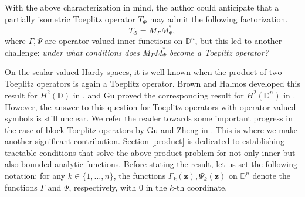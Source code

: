 \documentclass[12pt]{amsart}
\theoremstyle{definition}
\newcommand{\D}{\mathbb{D}}
\newcommand{\1}{{\mbox{\bf 1}}}
\begin{document}
With the above characterization in mind, the author could anticipate that a partially isometric Toeplitz operator $T_{\Phi}$ may admit the following factorization.
\[
T_{\Phi} = M_{\Gamma} M_{\Psi}^*,
\]
where $\Gamma, \Psi$ are operator-valued inner functions on $\D^n$, but this led to another challenge: \textit{under what conditions does $M_{\Gamma} M_{\Psi}^*$ become a Toeplitz operator?}

On the scalar-valued Hardy spaces, it is well-known when the product of two Toeplitz operators is again a Toeplitz operator. Brown and Halmos developed this result for $H^2(\D)$ in  \cite{BH}, and Gu proved the corresponding result for $H^2(\D^n)$ in \cite{Gu2}. However, the answer to this question for Toeplitz operators with operator-valued symbols is still unclear.  We refer the reader towards some important progress in the case of block Toeplitz operators by Gu and Zheng in \cite{GZ, Gu}.  This is where we make another significant contribution. Section \ref{product} is dedicated to establishing tractable conditions that solve the above product problem for not only inner but also bounded analytic functions.  Before stating the result, let us set the following notation: for any $k \in \{1,\ldots,n\}$, the functions $\Gamma_k(\bm{z}), \Psi_k(\bm{z})$ on $\D^n$ denote the functions $\Gamma$ and $\Psi$, respectively, with $0$ in the $k$-th coordinate.
\end{document}

